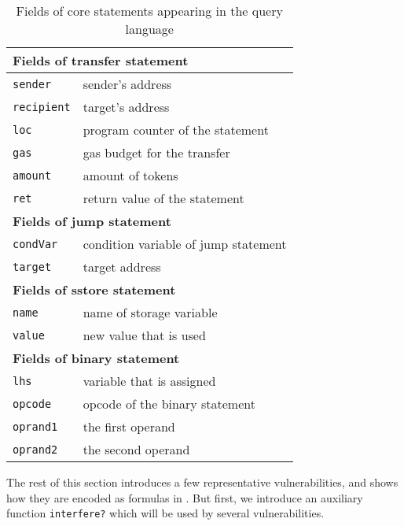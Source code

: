\begin{table}[]
\begin{tabular}{|l|l|}
\hline
\multicolumn{2}{|l|}{\textbf{Fields of transfer statement}} \\ \hline \hline
\texttt{sender}        & sender's address                   \\ \hline
\texttt{recipient}     & target's address                   \\ \hline
\texttt{loc}     & program counter of the statement                   \\ \hline
\texttt{gas}           & gas budget for the transfer                          \\ \hline
\texttt{amount}        & amount of tokens                   \\ \hline
\texttt{ret}        & return value of the statement                   \\ \hline \hline
\multicolumn{2}{|l|}{\textbf{Fields of jump statement}}     \\ \hline \hline
\texttt{condVar}     & condition variable of jump statement                     \\ \hline
\texttt{target}        & target address                     \\ \hline \hline
\multicolumn{2}{|l|}{\textbf{Fields of sstore statement}}    \\ \hline \hline
\texttt{name}           & name of storage variable           \\ \hline
\texttt{value}         & new value that is used             \\ \hline \hline
\multicolumn{2}{|l|}{\textbf{Fields of binary statement}}   \\ \hline \hline
\texttt{lhs}           & variable that is assigned          \\ \hline
\texttt{opcode}        & opcode of the binary statement     \\ \hline
\texttt{oprand1}       & the first operand                  \\ \hline
\texttt{oprand2}       & the second operand                 \\ \hline
\end{tabular}
    \caption{Fields of core statements appearing in the query language}
    \label{tbl:stmt-fields}
\end{table}

The rest of this section introduces a few representative vulnerabilities,
and shows how they are encoded as formulas in \toolname.
But first, we introduce an auxiliary function \texttt{interfere?} 
which will be used by several vulnerabilities.

